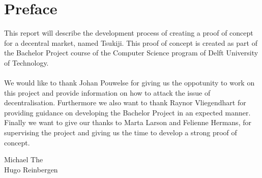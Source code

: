 \section{Preface}
This report will describe the development process of creating a proof of concept for a decentral market, named Tsukiji. 
This proof of concept is created as part of the Bachelor Project course of the Computer Science program of Delft University of Technology.\\
\\
We would like to thank Johan Pouwelse for giving us the oppotunity to work on this project and provide information on how to attack the issue of decentralisation. Furthermore we also want to thank Raynor Vliegendhart for providing guidance on developing the Bachelor Project in an expected manner. Finally we want to give our thanks to Marta Larson and Felienne Hermans, for supervising the project and giving us the time to develop a strong proof of concept.\\
\begin{flushright}
Michael The \\
Hugo Reinbergen
\end{flushright}